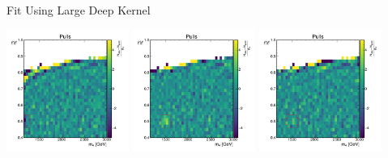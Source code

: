 \documentclass[10pt]{beamer}
\begin{document}
\begin{frame}{Fit Using Large Deep Kernel}
  \begin{center}
    \includegraphics[width=0.3\textwidth]{figures/2dpullplots/nnrbf_256_128_16/E_1200_0p5_100_0p05.pdf} 
    \includegraphics[width=0.3\textwidth]{figures/2dpullplots/nnrbf_256_128_16/E_1500_0p5_100_0p05.pdf} 
    \includegraphics[width=0.3\textwidth]{figures/2dpullplots/nnrbf_256_128_16/E_1500_0p5_150_0p05.pdf} 
  \end{center}


\end{frame}
\end{document}
